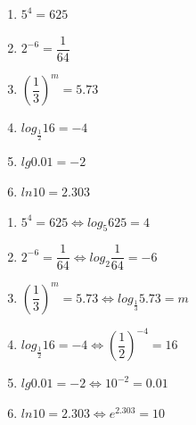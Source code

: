 \begin{enumerate}
    \begin{enumerate}
        \item $5^4 = 625$
        \item $2^{-6} = \dfrac{1}{64}$
        \item $\left(\dfrac{1}{3}\right)^m = 5.73$
        \item $log_{\frac{1}{2}}16 = -4$
        \item $lg0.01=-2$
        \item $ln10 = 2.303$
    \end{enumerate}
    \begin{jieda}
        \begin{enumerate}
            \item $5^4 = 625 \Longleftrightarrow log_5{625} = 4$
            \item $2^{-6} = \dfrac{1}{64} \Longleftrightarrow log_2{\dfrac{1}{64}} = -6$
            \item $(\dfrac{1}{3})^m = 5.73 \Longleftrightarrow log_{\frac{1}{3}}5.73 = m$
            \item $log_{\frac{1}{2}}16 = -4 \Longleftrightarrow (\dfrac{1}{2})^{-4} = 16$
            \item $lg0.01=-2 \Longleftrightarrow 10^{-2} = 0.01$
            \item $ln10 = 2.303 \Longleftrightarrow e^{2.303} = 10$
        \end{enumerate}
    \end{jieda}
\end{enumerate}
